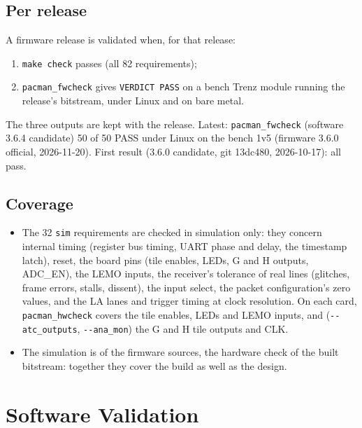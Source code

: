 \documentclass[11pt]{article}
\newcommand{\opt}[1]{\texttt{-{}-#1}}
\begin{document}
\subsection{Per release}

A firmware release is validated when, for that release:
\begin{enumerate}
\item \texttt{make check} passes (all 82 requirements);
\item \texttt{pacman\_fwcheck} gives \texttt{VERDICT PASS} on a bench Trenz module running the release's
  bitstream, under Linux and on bare metal.
\end{enumerate}
The three outputs are kept with the release.  Latest:  \texttt{pacman\_fwcheck} (software 3.6.4 candidate)
50 of 50 PASS under Linux on the bench 1v5 (firmware 3.6.0 official, 2026-11-20).  First result (3.6.0 candidate,
git 13dc480, 2026-10-17): all
pass.

\subsection{Coverage}

\begin{itemize}
\item The 32 \texttt{sim} requirements are checked in simulation only: they concern internal timing (register bus
  timing, UART phase and delay, the timestamp latch), reset, the board pins (tile enables, LEDs, G and H outputs,
  ADC\_EN), the LEMO inputs, the receiver's tolerance of real lines (glitches, frame errors, stalls, dissent), the
  input select, the packet configuration's zero values, and the LA lanes and trigger timing at clock resolution.  On each card, \texttt{pacman\_hwcheck}
  covers the tile enables, LEDs and LEMO inputs, and (\opt{atc\_outputs}, \opt{ana\_mon}) the G and H tile outputs and CLK.
\item The simulation is of the firmware sources, the hardware check of the built bitstream: together they cover
  the build as well as the design.
\end{itemize}

\section{Software Validation}\label{sec:software}
\end{document}
